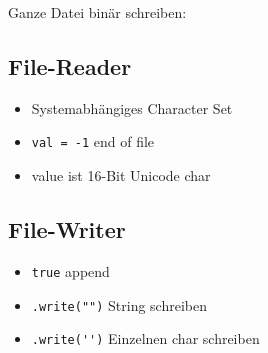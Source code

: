 \vspace{1mm}
\begin{minipage}[t]{0.48\columnwidth}
    Ganze Datei binär schreiben:
    
\end{minipage}



\subsection{File-Reader}
\begin{minipage}[t]{0.55\columnwidth}
    \vspace{-0.8\abovedisplayskip}
    
\end{minipage}
\begin{minipage}[t]{0.44\columnwidth}
    \raggedright%
    \begin{itemize}
        \item Systemabhängiges Character Set
        \item \lstinline{val = -1} \textrightarrow{} end of file
        \item value ist 16-Bit Unicode char
    \end{itemize}
\end{minipage}
\subsection{File-Writer}
\begin{minipage}[t]{0.6\columnwidth}
    \vspace{-0.8\abovedisplayskip}
    
\end{minipage}
\begin{minipage}[t]{0.39\columnwidth}
    \raggedright%
    \begin{itemize}
        \item \lstinline{true} \textrightarrow{} append
        \item \lstinline{.write("")} String schreiben
        \item \lstinline{.write('')} Einzelnen char schreiben
    \end{itemize}
\end{minipage}

